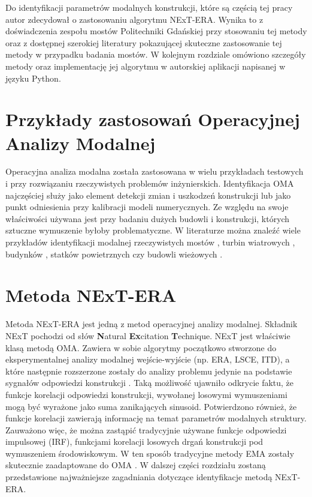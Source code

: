 Do identyfikacji parametrów modalnych konstrukcji, które są częścią tej pracy autor zdecydował o zastosowaniu algorytmu NExT-ERA. Wynika to z doświadczenia zespołu mostów Politechniki Gdańskiej przy stosowaniu tej metody oraz z dostępnej szerokiej literatury pokazującej skuteczne zastosowanie tej metody w przypadku badania mostów. W kolejnym rozdziale omówiono szczegóły metody oraz implementację jej algorytmu w autorskiej aplikacji napisanej w języku Python.

\section{Przykłady zastosowań Operacyjnej Analizy Modalnej}
Operacyjna analiza modalna została zastosowana w wielu przykładach testowych i przy rozwiązaniu rzeczywistych problemów inżynierskich. Identyfikacja OMA najczęściej służy jako element detekcji zmian i uszkodzeń konstrukcji lub jako punkt odniesienia przy kalibracji modeli numerycznych. Ze względu na swoje właściwości używana jest przy badaniu dużych budowli i konstrukcji, których sztuczne wymuszenie byłoby problematyczne. W literaturze można znaleźć wiele przykładów identyfikacji modalnej rzeczywistych mostów \parencite{L.Hermans1999,Siringoringo2008,Degrauwe2008,Liu2009,Bayraktar2009,Brownjohn2010,Dohler2011,Magalhaes2012,Benedettini2015,Brownjohn2017,Brownjohn2018,Poprawa2018,Barbieri2019,Qin2019,Favarelli2021}, turbin wiatrowych \parencite{Carne2010,Sarrafi2018}, budynków \parencite{Zhu2018,Xie2021}, statków powietrznych \parencite{SHEN2003,Moncayo2010} czy budowli wieżowych \parencite{Cabboi2017,Szafranski2020}. 

\section{Metoda NExT-ERA}
Metoda NExT-ERA jest jedną z metod operacyjnej analizy modalnej. Składnik NExT pochodzi od słów \textbf{N}atural \textbf{Ex}citation \textbf{T}echnique. NExT jest właściwie klasą metodą OMA. Zawiera w sobie algorytmy początkowo stworzone do eksperymentalnej analizy modalnej wejście-wyjście  (np. ERA, LSCE, ITD), a które następnie rozszerzone zostały do analizy problemu jedynie na podstawie sygnałów odpowiedzi konstrukcji . Taką możliwość ujawniło odkrycie faktu, że funkcje korelacji odpowiedzi konstrukcji, wywołanej losowymi wymuszeniami mogą być wyrażone jako suma zanikających sinusoid. Potwierdzono również, że funkcje korelacji zawierają informację na temat parametrów modalnych struktury. Zauważono więc, że można zastąpić tradycyjnie używane funkcje odpowiedzi impulsowej (IRF), funkcjami korelacji losowych drgań konstrukcji pod wymuszeniem środowiskowym. W ten sposób tradycyjne metody EMA zostały skutecznie zaadaptowane do OMA \parencite{Rainieri2014}. W dalszej części rozdziału zostaną przedstawione najważniejsze zagadniania dotyczące identyfikacje metodą NExT-ERA. 

